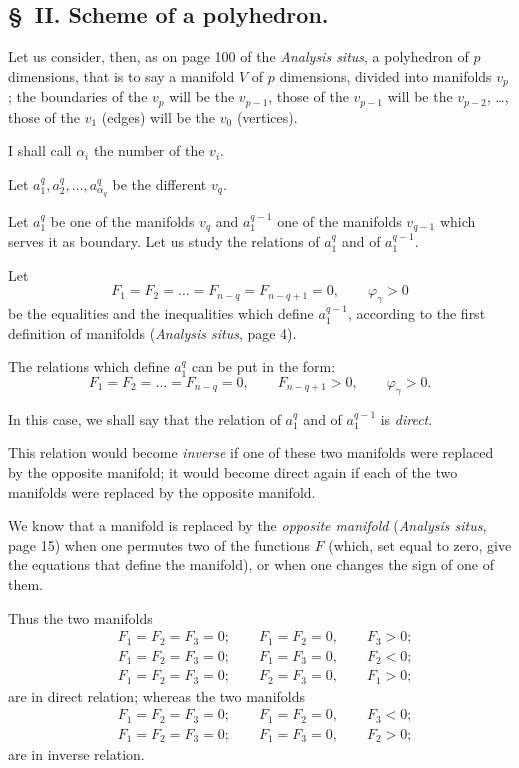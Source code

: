 \documentclass{article}
\begin{document}
\subsection*{\S~II. Scheme of a polyhedron.}

Let us consider, then, as on page 100 of the \emph{Analysis situs}, a polyhedron of $p$ dimensions, that is to say a manifold $V$ of $p$ dimensions, divided into manifolds $v_{p}$; the boundaries of the $v_{p}$ will be the $v_{p-1}$, those of the $v_{p-1}$ will be the $v_{p-2}$, \ldots, those of the $v_{1}$ (edges) will be the $v_{0}$ (vertices).

I shall call $\alpha_{i}$ the number of the $v_{i}$.

Let $a^{q}_{1}, a^{q}_{2}, \ldots, a^{q}_{\alpha_{q}}$ be the different $v_{q}$.

Let $a^{q}_{1}$ be one of the manifolds $v_{q}$ and $a^{q-1}_{1}$ one of the manifolds $v_{q-1}$ which serves it as boundary. Let us study the relations of $a^{q}_{1}$ and of $a^{q-1}_{1}$.

Let
\[ F_{1} = F_{2} = \ldots = F_{n-q} = F_{n-q+1} = 0, \qquad \varphi_{\gamma} > 0 \tag{1} \]
be the equalities and the inequalities which define $a^{q-1}_{1}$, according to the first definition of manifolds (\emph{Analysis situs}, page 4).

The relations which define $a^{q}_{1}$ can be put in the form:
\[ F_{1} = F_{2} = \ldots = F_{n-q} = 0, \qquad F_{n-q+1} > 0, \qquad \varphi_{\gamma} > 0. \tag{2} \]

In this case, we shall say that the relation of $a^{q}_{1}$ and of $a^{q-1}_{1}$ is \emph{direct}.

This relation would become \emph{inverse} if one of these two manifolds were replaced by the opposite manifold; it would become direct again if each of the two manifolds were replaced by the opposite manifold.


We know that a manifold is replaced by the \emph{opposite manifold} (\emph{Analysis situs}, page 15) when one permutes two of the functions $F$ (which, set equal to zero, give the equations that define the manifold), or when one changes the sign of one of them.

Thus the two manifolds
\[ \begin{aligned} &F_{1} = F_{2} = F_{3} = 0; \qquad F_{1} = F_{2} = 0, \qquad F_{3} > 0;\\ &F_{1} = F_{2} = F_{3} = 0; \qquad F_{1} = F_{3} = 0, \qquad F_{2} < 0;\\ &F_{1} = F_{2} = F_{3} = 0; \qquad F_{2} = F_{3} = 0, \qquad F_{1} > 0; \end{aligned} \]
are in direct relation; whereas the two manifolds
\[ \begin{aligned} &F_{1} = F_{2} = F_{3} = 0; \qquad F_{1} = F_{2} = 0, \qquad F_{3} < 0;\\ &F_{1} = F_{2} = F_{3} = 0; \qquad F_{1} = F_{3} = 0, \qquad F_{2} > 0; \end{aligned} \]
are in inverse relation.
\end{document}

